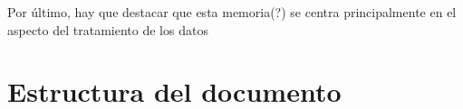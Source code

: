 Por último, hay que destacar que esta memoria(?) se centra principalmente en el aspecto del tratamiento de los datos

\section{Estructura del documento}























